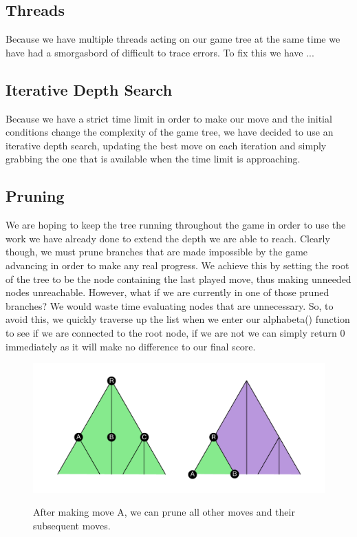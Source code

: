 \documentclass[a4paper, 12pt]{article}
\begin{document}
\subsection{Threads}
Because we have multiple threads acting on our game tree at the same time we have had a smorgasbord of difficult to trace errors. To fix this we have ...
\subsection{Iterative Depth Search}
Because we have a strict time limit in order to make our move and the initial conditions change the complexity of the game tree, we have decided to use an iterative depth search, updating the best move on each iteration and simply grabbing the one that is available when the time limit is approaching.
\subsection{Pruning}
We are hoping to keep the tree running throughout the game in order to use the work we have already done to extend the depth we are able to reach. Clearly though, we must prune branches that are made impossible by the game advancing in order to make any real progress. We achieve this by setting the root of the tree to be the node containing the last played move, thus making unneeded nodes unreachable. However, what if we are currently in one of those pruned branches? We would waste time evaluating nodes that are unnecessary. So, to avoid this,  we quickly traverse up the list when we enter our alphabeta() function to see if we are connected to the root node, if we are not we can simply return 0 immediately as it will make no difference to our final score.
\begin{figure}[h!]
  \centering
  	\includegraphics[width = 17cm]{TreePruning}\\
  \caption{After making move A, we can prune all other moves and their subsequent moves.}
\end{figure}
\end{document}
